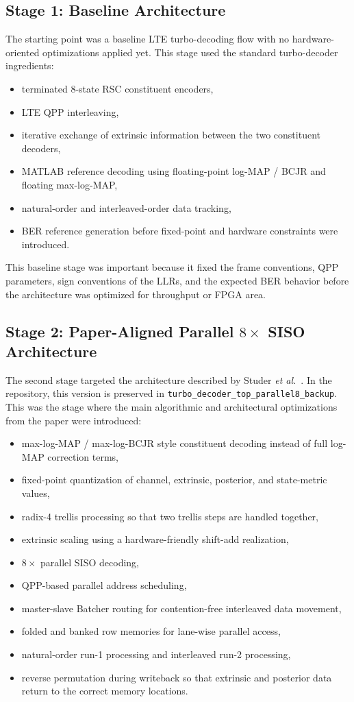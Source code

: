 \documentclass[conference]{IEEEtran}
\begin{document}
\subsection{Stage 1: Baseline Architecture}
The starting point was a baseline LTE turbo-decoding flow with no hardware-oriented optimizations applied yet. This stage used the standard turbo-decoder ingredients:
\begin{itemize}
\item terminated \(8\)-state RSC constituent encoders,
\item LTE QPP interleaving,
\item iterative exchange of extrinsic information between the two constituent decoders,
\item MATLAB reference decoding using floating-point log-MAP / BCJR and floating max-log-MAP,
\item natural-order and interleaved-order data tracking,
\item BER reference generation before fixed-point and hardware constraints were introduced.
\end{itemize}

This baseline stage was important because it fixed the frame conventions, QPP parameters, sign conventions of the LLRs, and the expected BER behavior before the architecture was optimized for throughput or FPGA area.

\subsection{Stage 2: Paper-Aligned Parallel \(8\times\) SISO Architecture}
The second stage targeted the architecture described by Studer \textit{et al.}~\cite{studer2011}. In the repository, this version is preserved in \texttt{turbo\_decoder\_top\_parallel8\_backup}. This was the stage where the main algorithmic and architectural optimizations from the paper were introduced:
\begin{itemize}
\item max-log-MAP / max-log-BCJR style constituent decoding instead of full log-MAP correction terms,
\item fixed-point quantization of channel, extrinsic, posterior, and state-metric values,
\item radix-4 trellis processing so that two trellis steps are handled together,
\item extrinsic scaling using a hardware-friendly shift-add realization,
\item \(8\times\) parallel SISO decoding,
\item QPP-based parallel address scheduling,
\item master-slave Batcher routing for contention-free interleaved data movement,
\item folded and banked row memories for lane-wise parallel access,
\item natural-order run-1 processing and interleaved run-2 processing,
\item reverse permutation during writeback so that extrinsic and posterior data return to the correct memory locations.
\end{itemize}
\end{document}

